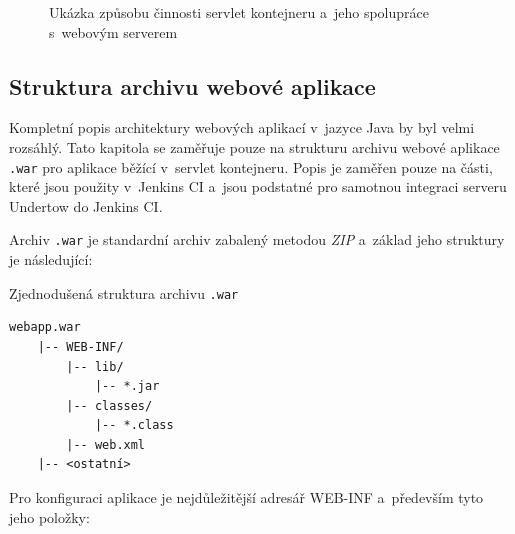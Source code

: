             \begin{figure}[ht]
                \begin{center}
                    \caption{Ukázka způsobu činnosti servlet kontejneru a~jeho spolupráce s~webovým serverem}
                    \label{imgServlet}
                \end{center}
            \end{figure}   

        \subsection{Struktura archivu webové aplikace} \label{kapWebXml}
            Kompletní popis architektury webových aplikací v~jazyce Java by byl velmi rozsáhlý. 
            Tato kapitola se zaměřuje pouze na strukturu archivu webové aplikace \texttt{.war} pro aplikace běžící v~servlet kontejneru.
            Popis je zaměřen pouze na části, které jsou použity v~Jenkins CI a~jsou podstatné
            pro samotnou integraci serveru Undertow do Jenkins CI.

            \medskip
            Archiv \texttt{.war} je standardní archiv zabalený metodou \emph{ZIP} a~základ jeho struktury je následující:
            
\begin{priklad} Zjednodušená struktura archivu \texttt{.war}
\begin{verbatim}
webapp.war
    |-- WEB-INF/
        |-- lib/
            |-- *.jar
        |-- classes/
            |-- *.class
        |-- web.xml
    |-- <ostatní>
\end{verbatim}
\end{priklad}


            Pro konfiguraci aplikace je nejdůležitější adresář WEB-INF a~především tyto jeho položky:

